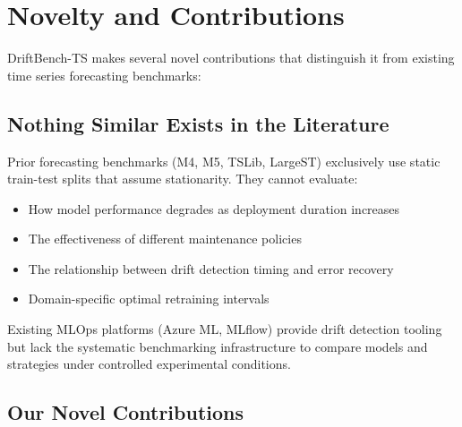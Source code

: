 \documentclass[conference]{IEEEtran}
\begin{document}
\section{Novelty and Contributions}

DriftBench-TS makes several novel contributions that distinguish it from existing time series forecasting benchmarks:

\subsection{Nothing Similar Exists in the Literature}
Prior forecasting benchmarks (M4, M5, TSLib, LargeST) exclusively use static train-test splits that assume stationarity. They cannot evaluate:
\begin{itemize}
	\item How model performance degrades as deployment duration increases
	\item The effectiveness of different maintenance policies
	\item The relationship between drift detection timing and error recovery
	\item Domain-specific optimal retraining intervals
\end{itemize}

Existing MLOps platforms (Azure ML, MLflow) provide drift detection tooling but lack the systematic benchmarking infrastructure to compare models and strategies under controlled experimental conditions.

\subsection{Our Novel Contributions}
\end{document}
